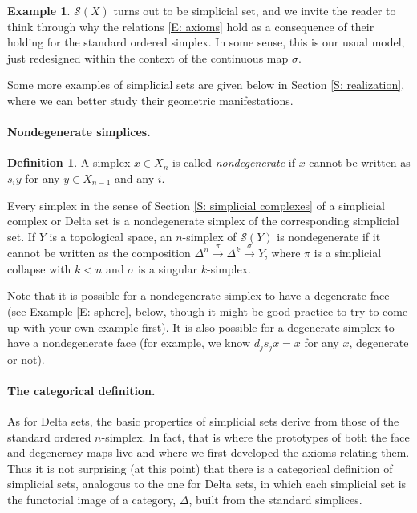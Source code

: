 \documentclass[12pt]{article}
\theoremstyle{plain}
\theoremstyle{definition}
\newtheorem{definition}[theorem]{Definition}
\newtheorem{example}[theorem]{Example}
\newcommand{\ms}[1]{\mathscr{#1}}
\begin{document}
\begin{example}
$\ms S(X)$ turns out to be simplicial set, and we invite the reader to think through why the relations \eqref{E: axioms} hold as a consequence of their holding for  the standard ordered simplex. 
In some sense, this is our usual model, just redesigned within the context of the continuous map $\sigma$.  
\end{example}


Some more examples of simplicial sets are given below in Section \ref{S: realization}, where we can better study their geometric manifestations.



\paragraph{Nondegenerate simplices.}

\begin{definition}
A simplex $x\in X_n$ is called \emph{nondegenerate} if $x$ cannot be written as $s_iy$ for any $y\in X_{n-1}$ and any $i$.
\end{definition}

Every simplex in the sense of Section \ref{S: simplicial complexes} of a simplicial complex or Delta set  is a nondegenerate simplex
of the corresponding simplicial set.  If $Y$ is a topological space, an $n$-simplex of $\ms S(Y)$ is nondegenerate if it cannot be written as the composition $\Delta^n\overset{\pi}{\to} \Delta^k\overset{\sigma}{\to} Y$, where $\pi$ is a simplicial collapse with $k<n$ and $\sigma$ is a singular $k$-simplex.

Note that it is possible for a nondegenerate simplex to have a degenerate face (see Example \ref{E: sphere}, below, though it might be good practice to try to come up with your own example first).  It is also possible  for a degenerate simplex to have a nondegenerate face (for example, we know $d_js_jx=x$ for any $x$, degenerate or not).


\paragraph{The categorical definition.} As for Delta sets, the basic properties of simplicial sets derive from those of the standard ordered $n$-simplex. In fact, that is where the prototypes of both the face and degeneracy maps live and where we first developed the axioms relating them. Thus it is not surprising (at this point) that there is a categorical definition of simplicial sets, analogous to the one for Delta sets, in which each simplicial set is the functorial image of a category, $\Delta$, built from the standard simplices. 
\end{document}
